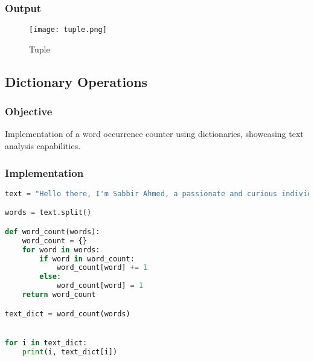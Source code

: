 \documentclass[12pt]{article}
\begin{document}
\subsubsection{Output}
\begin{figure}[h]
    \centering
    \texttt{[image: tuple.png]}
    \caption{Tuple}
    \label{fig:enter-label}
\end{figure}

\subsection{Dictionary Operations\hfill\href{https://github.com/sabbirahmed404/Python-Practice/blob/main/Dictionary.py}{\faGithub}}
\subsubsection{Objective}
Implementation of a word occurrence counter using dictionaries, showcasing text analysis capabilities.

\subsubsection{Implementation}
\begin{lstlisting}[language=Python, caption=Dictionary Operations Implementation]
text = "Hello there, I'm Sabbir Ahmed, a passionate and curious individual from Dhaka, Bangladesh. As a Computer Science and Engineering student at Green University of Bangladesh, I am constantly seeking new opportunities to expand my knowledge and skills in the software engineering and data science field."

words = text.split()

def word_count(words):
    word_count = {}  
    for word in words:
        if word in word_count:
            word_count[word] += 1
        else:
            word_count[word] = 1
    return word_count

text_dict = word_count(words)


for i in text_dict:
    print(i, text_dict[i])


\end{lstlisting}
\end{document}
